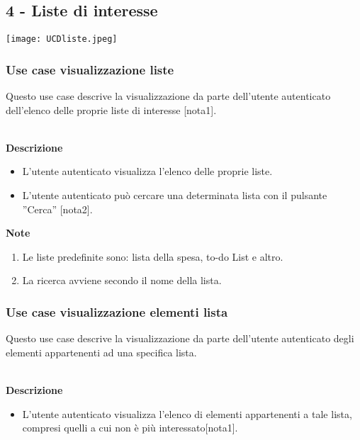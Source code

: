 \documentclass[a4paper,12pt]{article}
\begin{document}
\subsection*{4 - Liste di interesse}

\begin{center}
  \texttt{[image: UCDliste.jpeg]}
\end{center}
\subsubsection*{Use case visualizzazione liste}

Questo use case descrive la visualizzazione da parte dell'utente autenticato dell'elenco delle proprie liste di interesse [nota1].

\textbf{\\Descrizione}
\begin{itemize} \setlength\itemsep{0.01em}
\item L'utente autenticato visualizza l'elenco delle proprie liste.
\item L'utente autenticato può cercare una determinata lista con il pulsante ''Cerca'' [nota2].
\end{itemize}

\textbf{Note}
\begin{enumerate} \setlength\itemsep{0.01em}
\item Le liste predefinite sono: lista della spesa, to-do List e altro.
\item La ricerca avviene secondo il nome della lista.
\end{enumerate}




\subsubsection*{Use case visualizzazione elementi lista}

Questo use case descrive la visualizzazione da parte dell'utente autenticato degli elementi appartenenti ad una specifica lista.

\textbf{\\Descrizione}
\begin{itemize} \setlength\itemsep{0.01em}
\item L'utente autenticato visualizza l'elenco di elementi appartenenti a tale lista, compresi quelli a cui non è più interessato[nota1].
\end{itemize}
\end{document}
